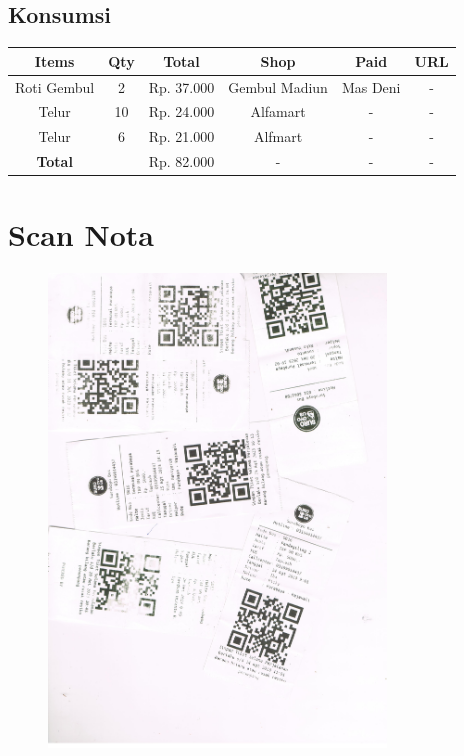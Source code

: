 \documentclass{article} %
\begin{document}
	\subsection{Konsumsi}
	
	\begin{table}[H]
		\centering
		\begin{tabular}{|c|c|c|c|c|c|}
			\hline
			Items & Qty & Total & Shop & Paid & URL \\
			\hline
			Roti Gembul & 2 & Rp. 37.000 & Gembul Madiun & Mas Deni & - \\
			Telur & 10 & Rp. 24.000 & Alfamart & - & - \\
			Telur & 6 & Rp. 21.000 & Alfmart & - & - \\
			\hline
			\textbf{Total} & & Rp. 82.000 & - & - & - \\
			\hline
		\end{tabular}
	\end{table}

	\newpage
	\section{Scan Nota}

	\begin{figure}[H]
		\centering
		\includegraphics[width=0.8\textwidth]{images/bus_sby}
	\end{figure}
\end{document}
